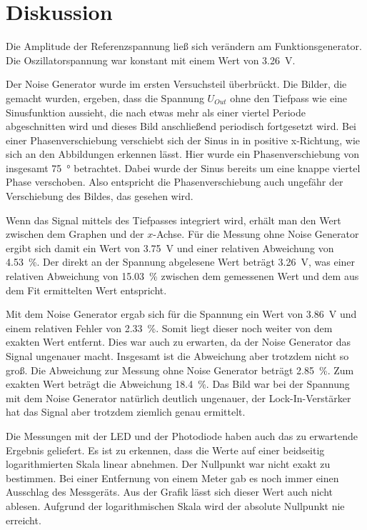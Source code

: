 \section{Diskussion}
\label{sec:Diskussion}

Die Amplitude der Referenzspannung ließ sich verändern am Funktionsgenerator. Die Oszillatorspannung war konstant 
mit einem Wert von \SI{3.26}{\V}. %

\noindent Der Noise Generator wurde im ersten Versuchsteil überbrückt. Die Bilder, die gemacht wurden, ergeben, dass 
die Spannung $U_{Out}$ ohne den Tiefpass wie eine Sinusfunktion aussieht, die nach etwas mehr als einer viertel 
Periode abgeschnitten wird und dieses Bild anschließend periodisch fortgesetzt wird. 
Bei einer Phasenverschiebung verschiebt sich der Sinus in in positive x-Richtung, wie sich an den Abbildungen 
erkennen lässt. Hier wurde ein Phasenverschiebung von insgesamt \SI{75}{\degree} betrachtet. %
Dabei wurde der Sinus 
bereits um eine knappe viertel Phase verschoben. Also entspricht die Phasenverschiebung auch ungefähr der 
Verschiebung des Bildes, das gesehen wird. 

\noindent Wenn das Signal mittels des Tiefpasses integriert wird, erhält man den Wert zwischen dem Graphen und der 
$x$-Achse. Für die Messung ohne Noise Generator ergibt sich damit ein Wert von \SI{3.75}{\volt} und einer relativen 
Abweichung von \SI{4.53}{\percent}. Der direkt an der Spannung  abgelesene Wert beträgt \SI{3.26}{\volt}, was einer%
relativen Abweichung von  \SI{15.03}{\percent} zwischen dem gemessenen Wert und dem aus dem Fit ermittelten Wert 
entspricht. 

\noindent Mit dem Noise Generator ergab sich für die Spannung ein Wert von \SI{3.86}{\volt} und einem relativen 
Fehler von \SI{2.33}{\percent}. Somit liegt dieser noch weiter von dem exakten Wert entfernt. Dies war auch zu 
erwarten, da der Noise Generator das Signal ungenauer macht. Insgesamt ist die Abweichung aber trotzdem nicht so %
groß. Die Abweichung zur Messung ohne Noise Generator beträgt \SI{2.85}{\percent}. Zum exakten Wert beträgt die 
Abweichung \SI{18.4}{\percent}. Das Bild war bei der Spannung mit dem Noise Generator natürlich deutlich ungenauer, 
der Lock-In-Verstärker hat das Signal aber trotzdem ziemlich genau ermittelt. 

\noindent Die Messungen mit der LED und der Photodiode haben auch das zu erwartende Ergebnis geliefert. Es ist zu 
erkennen, dass die Werte auf einer beidseitig logarithmierten Skala linear abnehmen. Der Nullpunkt war nicht exakt 
zu bestimmen. Bei einer Entfernung von einem Meter gab es noch immer einen Ausschlag des Messgeräts. Aus der Grafik 
lässt sich dieser Wert auch nicht ablesen. Aufgrund der logarithmischen Skala wird der absolute Nullpunkt nie 
erreicht.  
